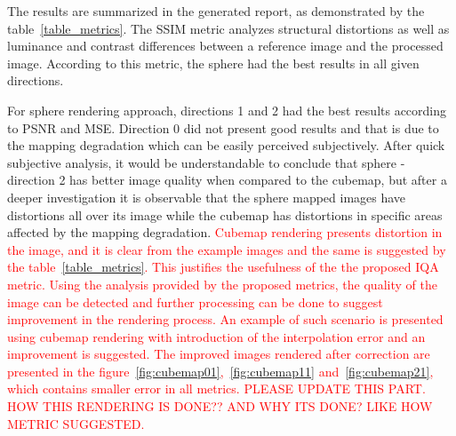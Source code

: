 \documentclass[10pt,conference]{IEEEtran}
\begin{document}
The results are summarized in the generated report, as demonstrated by the table~\ref{table_metrics}. The SSIM metric analyzes structural distortions as well as luminance and contrast differences between a reference image and the processed image. According to this metric, the sphere had the best results in all given directions.

For sphere rendering approach, directions 1 and 2 had the best results according to PSNR and MSE. Direction 0 did not present good results and that is due to the mapping degradation which can be easily perceived subjectively. After quick subjective analysis, it would be understandable to conclude that sphere - direction 2 has better image quality when compared to the cubemap, but after a deeper investigation it is observable that the sphere mapped images have distortions all over its image while the cubemap has distortions in specific areas affected by the mapping degradation. \textcolor{red}{Cubemap rendering presents distortion in the image, and it is clear from the example images and the same is suggested by the table~\ref{table_metrics}. This justifies the usefulness of the the proposed IQA metric. Using the analysis provided by the proposed metrics, the quality of the image can be detected and further processing can be done to suggest improvement in the rendering process. An example of such scenario is presented using cubemap rendering with introduction of the interpolation error and an improvement is suggested. The improved images rendered after correction are presented in the figure~\ref{fig:cubemap01},~\ref{fig:cubemap11} and~\ref{fig:cubemap21}, which contains smaller error in all metrics.  }
\textcolor{red}{PLEASE UPDATE THIS PART. HOW THIS RENDERING IS DONE?? AND WHY ITS DONE? LIKE HOW METRIC SUGGESTED.}
\end{document}
